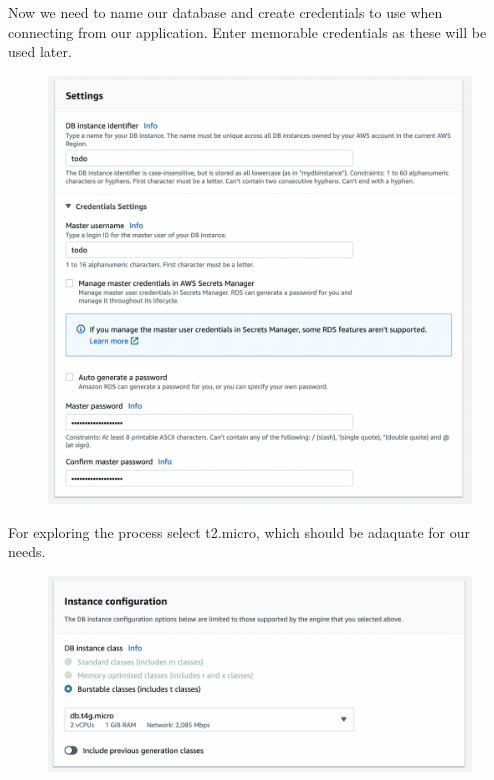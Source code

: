 \documentclass{csse4400}
\begin{document}
Now we need to name our database and create credentials to use when connecting from our application.
Enter memorable credentials as these will be used later.

\begin{figure}[H]
  \includegraphics[width=\textwidth]{images/db3}
\end{figure}

For exploring the process select t2.micro,
which should be adaquate for our needs.


\begin{figure}[H]
  \includegraphics[width=\textwidth]{images/db4}
\end{figure}
\end{document}
